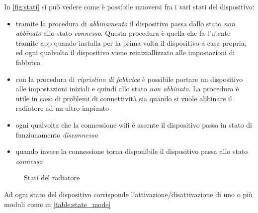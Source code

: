 \documentclass[12pt,a4paper,twoside,titlepage]{book}
\begin{document}
In \autoref{fig:stati} si può vedere come è possibile muoversi fra i vari stati del dispositivo:
\begin{itemize}
    \item tramite la procedura di \textit{abbinamento} il dispositivo passa dallo stato \textit{non abbinato}
        allo stato \textit{connesso}. Questa procedura è quella che fa l'utente tramite app quando installa 
        per la prima volta il dispositivo a casa propria, ed ogni qualvolta il dispositivo viene reiniziallizzato 
        alle impostazioni di fabbrica 
    \item con la procedura di \textit{ripristino di fabbrica} è possibile portare un dispositivo alle impostazioni 
        iniziali e quindi allo stato \textit{non abbinato}. La procedura è utile in caso di problemi di connettività 
        sia quando si vuole abbinare il radiatore ad un altro impianto
    \item ogni qualvolta che la connessione \Gls{wifi} è assente il dispositivo passa in stato di funzionamento \textit{disconnesso}
    \item quando invece la connessione torna disponibile il dispositivo passa allo stato \textit{connesso}
\end{itemize}

\begin{figure}[ht]
    \centering
    \caption{Stati del radiatore}
    \label{fig:stati}
\end{figure}

Ad ogni stato del dispositivo corrisponde l'attivazione/disattivazione di uno o più
moduli come in \autoref{table:state_mode}
\end{document}
